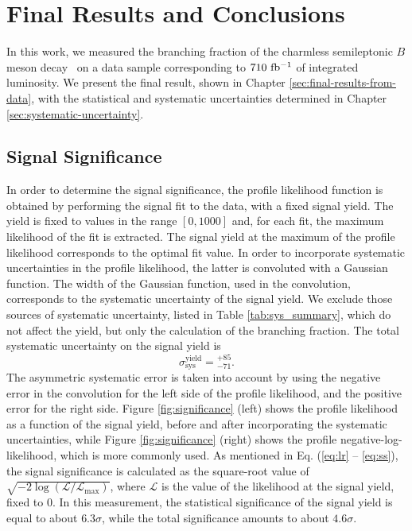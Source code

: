 \chapter{Final Results and Conclusions}\label{sec:results}

In this work, we measured the branching fraction of the charmless semileptonic $B$ meson decay \decayb~on a data sample corresponding to $710\mathrm{~fb^{-1}}$ of integrated luminosity. We present the final result, shown in Chapter \ref{sec:final-results-from-data}, with the statistical and systematic uncertainties determined in Chapter \ref{sec:systematic-uncertainty}.

\section{Signal Significance}

In order to determine the signal significance, the profile likelihood function is obtained by performing the signal fit to the data, with a fixed signal yield. The yield is fixed to values in the range $[0, 1000]$ and, for each fit, the maximum likelihood of the fit is extracted. The signal yield at the maximum of the profile likelihood corresponds to the optimal fit value. In order to incorporate systematic uncertainties in the profile likelihood, the latter is convoluted with a Gaussian function. The width of the Gaussian function, used in the convolution, corresponds to the systematic uncertainty of the signal yield. We exclude those sources of systematic uncertainty, listed in Table \ref{tab:sys_summary}, which do not affect the yield, but only the calculation of the branching fraction. The total systematic uncertainty on the signal yield is
\begin{equation}
\sigma_{\mathrm{sys}}^{\mathrm{yield}} = {}_{-71}^{+85}.
\end{equation}
The asymmetric systematic error is taken into account by using the negative error in the convolution for the left side of the profile likelihood, and the positive error for the right side. Figure \ref{fig:significance} (left) shows the profile likelihood as a function of the signal yield, before and after incorporating the systematic uncertainties, while Figure \ref{fig:significance} (right) shows the profile negative-log-likelihood, which is more commonly used. As mentioned in Eq. (\ref{eq:lr} -- \ref{eq:ss}), the signal significance is calculated as the square-root value of $\sqrt{-2\log(\mathcal{L}/\mathcal{L}_{\mathrm{max}})}$, where $\mathcal{L}$ is the value of the likelihood at the signal yield, fixed to 0. In this measurement, the statistical significance of the signal yield is equal to about $6.3\sigma$, while the total significance amounts to about $4.6\sigma$.

